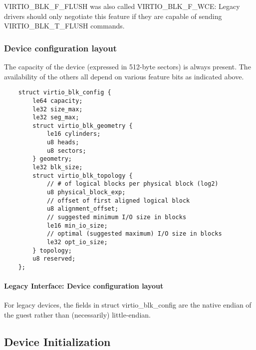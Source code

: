 VIRTIO_BLK_F_FLUSH was also called VIRTIO_BLK_F_WCE: Legacy drivers
should only negotiate this feature if they are capable of sending
VIRTIO_BLK_T_FLUSH commands.

\subsubsection{Device configuration layout}\label{sec:Device Types / Block Device / Feature bits / Device configuration layout}

The capacity of the device (expressed in 512-byte sectors) is always
present. The availability of the others all depend on various feature
bits as indicated above.

\begin{lstlisting}
	struct virtio_blk_config {
		le64 capacity;
		le32 size_max;
		le32 seg_max;
		struct virtio_blk_geometry {
			le16 cylinders;
			u8 heads;
			u8 sectors;
		} geometry;
		le32 blk_size;
		struct virtio_blk_topology {
			// # of logical blocks per physical block (log2)
			u8 physical_block_exp;
			// offset of first aligned logical block
			u8 alignment_offset;
			// suggested minimum I/O size in blocks
			le16 min_io_size;
			// optimal (suggested maximum) I/O size in blocks
			le32 opt_io_size;
		} topology;
		u8 reserved;
	};
\end{lstlisting}


\paragraph{Legacy Interface: Device configuration layout}\label{sec:Device Types / Block Device / Feature bits / Device configuration layout / Legacy Interface: Device configuration layout}
For legacy devices, the fields in struct virtio_blk_config are the
native endian of the guest rather than (necessarily) little-endian.


\subsection{Device Initialization}\label{sec:Device Types / Block Device / Device Initialization}

